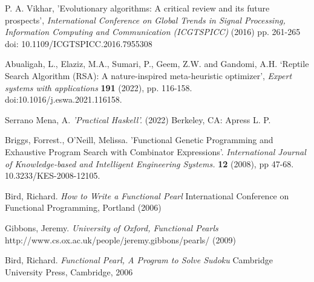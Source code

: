 \documentclass[11pt]{article}  %
\theoremstyle{definition}
\theoremstyle{remark}
\begin{document}
\begin{thebibliography}{99}
P. A. Vikhar,
'Evolutionary algorithms: A critical review and its future prospects',
{\em International Conference on Global Trends in Signal Processing, Information Computing and Communication (ICGTSPICC)}
(2016)
pp. 261-265
doi: 10.1109/ICGTSPICC.2016.7955308

Abualigah, L., Elaziz, M.A., Sumari, P., Geem, Z.W. and Gandomi, A.H. 
‘Reptile Search Algorithm (RSA): A nature-inspired meta-heuristic optimizer’,
{\em  Expert systems with applications}
{\bf 191}
(2022), 
pp. 116-158.
 doi:10.1016/j.eswa.2021.116158.

Serrano Mena, A. 
{\em 'Practical Haskell'.}
(2022) Berkeley, CA: 
Apress L. P.

Briggs, Forrest., O'Neill, Melissa. 
'Functional Genetic Programming and Exhaustive Program Search with Combinator Expressions'.
{\em International Journal of Knowledge-based and Intelligent Engineering Systems.}
{\bf 12}
(2008),
pp 47-68. 
10.3233/KES-2008-12105. 

Bird, Richard.
{\em How to Write a Functional Pearl}
International Conference on Functional Programming, Portland
(2006)

Gibbons, Jeremy.
{\em University of Oxford, Functional Pearls}
http://www.cs.ox.ac.uk/people/jeremy.gibbons/pearls/
(2009)

Bird, Richard.
{\em Functional Pearl, A Program to Solve Sudoku}
Cambridge University Press, Cambridge, 2006

\end{thebibliography}
\end{document}
